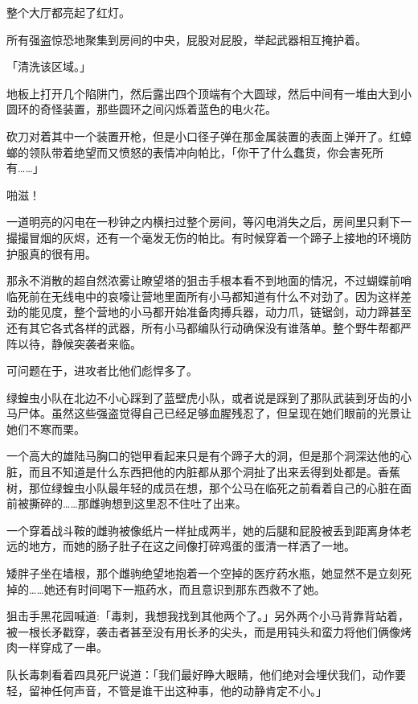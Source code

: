整个大厅都亮起了红灯。

所有强盗惊恐地聚集到房间的中央，屁股对屁股，举起武器相互掩护着。

「{\mtzh 清洗该区域。}」

地板上打开几个陷阱门，然后露出四个顶端有个大圆球，然后中间有一堆由大到小圆环的奇怪装置，那些圆环之间闪烁着蓝色的电火花。

砍刀对着其中一个装置开枪，但是小口径子弹在那金属装置的表面上弹开了。红蟑螂的领队带着绝望而又愤怒的表情冲向帕比，「你干了什么蠢货，你会害死所有……」

啪滋！

一道明亮的闪电在一秒钟之内横扫过整个房间，等闪电消失之后，房间里只剩下一撮撮冒烟的灰烬，还有一个毫发无伤的帕比。有时候穿着一个蹄子上接地的环境防护服真的很有用。

\horizonline


那永不消散的超自然浓雾让瞭望塔的狙击手根本看不到地面的情况，不过蝴蝶前哨临死前在无线电中的哀嚎让营地里面所有小马都知道有什么不对劲了。因为这样差劲的能见度，整个营地的小马都开始准备肉搏兵器，动力爪，链锯剑，动力蹄甚至还有其它各式各样的武器，所有小马都编队行动确保没有谁落单。整个野牛帮都严阵以待，静候突袭者来临。

可问题在于，进攻者比他们彪悍多了。

绿蝗虫小队在北边不小心踩到了蓝壁虎小队，或者说是踩到了那队武装到牙齿的小马尸体。虽然这些强盗觉得自己已经足够血腥残忍了，但呈现在她们眼前的光景让她们不寒而栗。

一个高大的雄陆马胸口的铠甲看起来只是有个蹄子大的洞，但是那个洞深达他的心脏，而且不知道是什么东西把他的内脏都从那个洞扯了出来丢得到处都是。香蕉树，那位绿蝗虫小队最年轻的成员在想，那个公马在临死之前看着自己的心脏在面前被撕碎的……那雌驹想到这里忍不住吐了出来。

一个穿着战斗鞍的雌驹被像纸片一样扯成两半，她的后腿和屁股被丢到距离身体老远的地方，而她的肠子肚子在这之间像打碎鸡蛋的蛋清一样洒了一地。

矮胖子坐在墙根，那个雌驹绝望地抱着一个空掉的医疗药水瓶，她显然不是立刻死掉的……她还有时间喝下一瓶药水，而且意识到那东西救不了她。

狙击手黑花园喊道:「毒刺，我想我找到其他两个了。」另外两个小马背靠背站着，被一根长矛戳穿，袭击者甚至没有用长矛的尖头，而是用钝头和蛮力将他们俩像烤肉一样穿成了一串。

队长毒刺看着四具死尸说道：「我们最好睁大眼睛，他们绝对会埋伏我们，动作要轻，留神任何声音，不管是谁干出这种事，他的动静肯定不小。」

